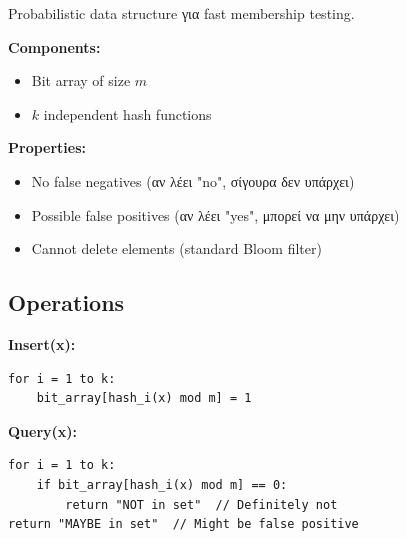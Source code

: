 \begin{definitionbox}
Probabilistic data structure για fast membership testing.

\textbf{Components:}
\begin{itemize}
    \item Bit array of size $m$
    \item $k$ independent hash functions
\end{itemize}

\textbf{Properties:}
\begin{itemize}
    \item No false negatives (αν λέει "no", σίγουρα δεν υπάρχει)
    \item Possible false positives (αν λέει "yes", μπορεί να μην υπάρχει)
    \item Cannot delete elements (standard Bloom filter)
\end{itemize}
\end{definitionbox}

\subsection{Operations}

\begin{center}
\end{center}

\begin{algorithmbox}
\textbf{Insert(x):}
\begin{lstlisting}[language=pseudo]
for i = 1 to k:
    bit_array[hash_i(x) mod m] = 1
\end{lstlisting}

\textbf{Query(x):}
\begin{lstlisting}[language=pseudo]
for i = 1 to k:
    if bit_array[hash_i(x) mod m] == 0:
        return "NOT in set"  // Definitely not
return "MAYBE in set"  // Might be false positive
\end{lstlisting}
\end{algorithmbox}

